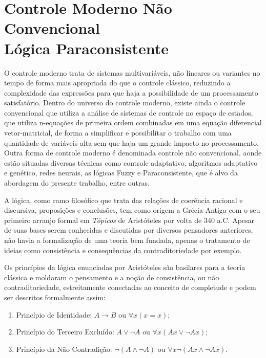 \newpage



\section{Controle Moderno Não Convencional \\ Lógica Paraconsistente}

O controle moderno trata de sistemas multivariáveis, não lineares ou variantes no tempo de forma mais apropriada do que o controle clássico, reduzindo a complexidade das expressões para que haja a possibilidade de um processamento satisfatório.
Dentro do universo do controle moderno, existe ainda o controle convencional que utiliza a análise de sistemas de controle no espaço de estados, que utiliza n-equações de primeira ordem combinadas em uma equação diferencial vetor-matricial, de forma a simplificar e possibilitar o trabalho com uma quantidade de variáveis alta sem que haja um grande impacto no processamento.  \cite{Ogata} 
Outra forma de controle moderno é denominada controle não convencional, aonde estão situadas diversas técnicas como controle adaptativo, algoritmos adaptativo e genético, redes neurais, as lógicas Fuzzy e Paraconsistente, que é alvo da abordagem do presente trabalho, entre outras.

A lógica, como ramo filosófico que trata das relações de coerência racional e discursiva, proposições e conclusões, tem como origem a Grécia Antiga com o seu primeiro arranjo formal em \emph{Tópicos} de Aristóteles por volta de 340 a.C. Apesar de suas bases serem conhecidas e discutidas por diversos pensadores anteriores, não havia a formalização de uma teoria bem fundada, apenas o tratamento de ideias como consistência e consequências da contraditoriedade por exemplo. 

Os princípios da lógica enunciadas por Aristóteles são basilares para a teoria clássica e moldaram o pensamento e a noção de consistência, ou não contraditoriedade, estreitamente conectadas ao conceito de completude e podem ser descritos formalmente assim:


\begin{enumerate}
\item Princípio de Identidade: 
    \begin{math}
	A \rightarrow B 
	\textrm{ ou } 
	\forall x(x=x);
    \end{math}

\item Princípio do Terceiro Excluído:
    \begin{math}
	A \vee \neg A
	\textrm{ ou }
	\forall x(Ax \vee \neg Ax);
    \end{math}

\item Princípio da Não Contradição: 
    \begin{math}
	\neg (A \wedge \neg A)
	\textrm{ ou }
	\forall x\neg(Ax \wedge \neg Ax).
    \end{math}

\end{enumerate}

